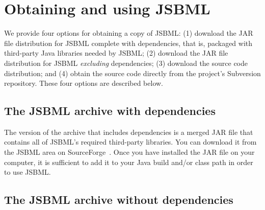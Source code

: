 
\section{Obtaining and using JSBML}
\label{sec:obtaining-jsbml}

We provide four options for obtaining a copy of JSBML: (1) download the JAR
file distribution for JSBML complete with dependencies, that is, packaged
with third-party Java libraries needed by JSBML; (2) download the JAR file
distribution for JSBML \emph{excluding} dependencies; (3) download the
source code distribution; and (4) obtain the source code directly from the
project's Subversion repository. These four options are described below.


\subsection{The JSBML archive with dependencies}

The version of the archive that includes dependencies is a merged JAR file
that contains all of JSBML's required third-party libraries. You can
download it from the JSBML area on SourceForge~\cite{JSBMLdownload}. Once
you have installed the JAR file on your computer, it is sufficient to add
it to your Java build and/or class path in order to use JSBML.

\subsection{The JSBML archive without dependencies}


